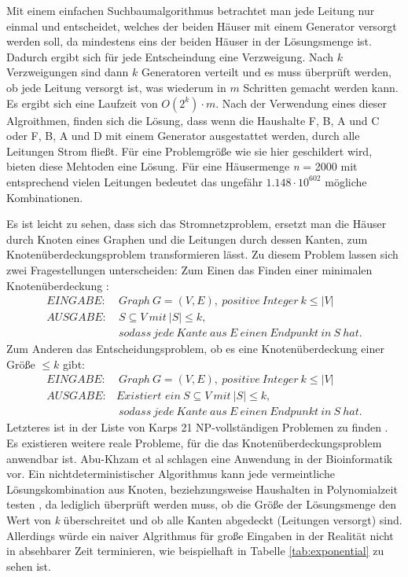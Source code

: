 Mit einem einfachen Suchbaumalgorithmus betrachtet man jede Leitung nur einmal und entscheidet, welches der beiden Häuser mit einem Generator versorgt werden soll, da mindestens eins der beiden Häuser in der Lösungsmenge ist. Dadurch ergibt sich für jede Entscheindung eine Verzweigung. Nach $k$ Verzweigungen sind dann $k$ Generatoren verteilt und es muss überprüft werden, ob jede Leitung versorgt ist, was wiederum in $m$ Schritten gemacht werden kann. Es ergibt sich eine Laufzeit von $O(2^{k}) \cdot m$.
Nach der Verwendung eines dieser Algroithmen, finden sich die Lösung, dass wenn die Haushalte F, B, A und C oder F, B, A und D mit einem Generator ausgestattet werden, durch alle Leitungen Strom fließt. Für eine Problemgröße wie sie hier geschildert wird, bieten diese Mehtoden eine Lösung. Für eine Häusermenge \emph{n} = 2000 mit entsprechend vielen Leitungen bedeutet das ungefähr $1.148 \cdot 10^{602}$ mögliche Kombinationen.

Es ist leicht zu sehen, dass sich das Stromnetzproblem, ersetzt man die Häuser durch Knoten eines Graphen und die Leitungen durch dessen Kanten, zum Knotenüberdeckungsproblem transformieren lässt. Zu diesem Problem lassen sich zwei Fragestellungen unterscheiden: Zum Einen das Finden einer minimalen Knotenüberdeckung \cite{trees}:
\begin{align*}
EINGABE: &\ Graph\ G=(V,E),\ positive\ Integer\ k\leq |V|\\
AUSGABE: &\ S\subseteq V\ mit\ |S|\leq k,\\
&\ sodass\ jede\ Kante\ aus\ E\ einen\ Endpunkt\ in\ S\ hat.
\end{align*}
Zum Anderen das Entscheidungsproblem, ob es eine Knotenüberdeckung einer Größe $\leq k$ gibt:
\begin{align*}
EINGABE: &\ Graph\ G=(V,E),\ positive\ Integer\ k\leq |V|\\
AUSGABE: &\textit{Existiert ein}\ S\subseteq V\ mit\ |S|\leq k,\\
&\ sodass\ jede\ Kante\ aus\ E\ einen\ Endpunkt\ in\ S\ hat.
\end{align*}
Letzteres ist in der Liste von Karps 21 NP-vollständigen Problemen zu finden \cite{karp}.
Es existieren weitere reale Probleme, für die das Knotenüberdeckungsproblem anwendbar ist. Abu-Khzam et al \cite{paper:3} schlagen eine Anwendung in der Bioinformatik vor.
Ein nichtdeterministischer Algorithmus kann jede vermeintliche Lösungskombination aus Knoten, beziehzungsweise Haushalten in Polynomialzeit testen \cite{intract}, da lediglich überprüft werden muss, ob die Größe der Lösungsmenge den Wert von \emph{k} überschreitet und ob alle Kanten abgedeckt (Leitungen versorgt) sind.
 Allerdings würde ein naiver Algrithmus für große Eingaben in der Realität nicht in absehbarer Zeit terminieren, wie beispielhaft in Tabelle \ref{tab:exponential} zu sehen ist.
 
